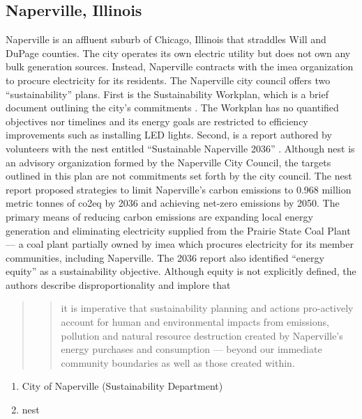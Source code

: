 \subsection{Naperville, Illinois}
Naperville is an affluent suburb of Chicago, Illinois that straddles Will and
DuPage counties. The city operates its own electric utility but does not own any
bulk generation sources. Instead, Naperville contracts with the \ac{imea}
organization to procure electricity for its residents. The Naperville city
council offers two ``sustainability'' plans. First is the Sustainability
Workplan, which is a brief document outlining the city's commitments
\cite{mjolness_city_2025}. The Workplan has no quantified objectives nor
timelines and its energy goals are restricted to efficiency improvements such as
installing LED lights. Second, is a report authored by volunteers with the
\acl{nest} entitled ``Sustainable Naperville 2036''
\cite{trendler_sustainable_2021}. Although \ac{nest} is an advisory organization
formed by the Naperville City Council, the targets outlined in this plan are not
commitments set forth by the city council. The \ac{nest} report proposed
strategies to limit Naperville's carbon emissions to 0.968 million metric tonnes
of \ac{co2eq} by 2036 and achieving net-zero emissions by 2050. The primary
means of reducing carbon emissions are expanding local energy generation and
eliminating electricity supplied from the Prairie State Coal Plant --- a coal
plant partially owned by \ac{imea} which procures electricity for its member
communities, including Naperville. The 2036 report also identified ``energy
equity'' as a sustainability objective. Although equity is not explicitly
defined, the authors describe disproportionality and implore that
\begin{quote}
    \blockcquote[11]{trendler_sustainable_2021}{it is imperative that
    sustainability planning and actions pro-actively account for human and
    environmental  
    impacts from emissions, pollution and natural resource destruction created
    by Naperville's energy purchases and  consumption --- beyond our immediate
    community boundaries as well as those created within.}
\end{quote}
\begin{enumerate}
    \item City of Naperville (Sustainability Department)
    \item \ac{nest}
\end{enumerate}



